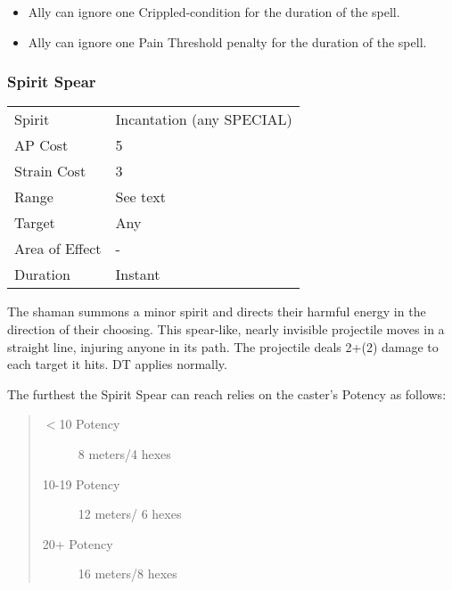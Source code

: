 \documentclass[11pt,a4paper,twocolumn]{book}
\begin{document}
\begin{itemize}
	\item Ally can ignore one Crippled-condition for the duration of the spell.
	\item Ally can ignore one Pain Threshold penalty for the duration of the spell.
\end{itemize}

\subsubsection*{Spirit Spear}
{
	\begin{tabu} to 75mm{| X[l,4] | X[l,7] |}
		\hline
		Spirit         & Incantation (any SPECIAL) \\
		AP Cost        & 5                         \\
		Strain Cost    & 3                         \\
		Range          & See text                  \\
		Target         & Any                       \\
		Area of Effect & -                         \\
		Duration       & Instant                   \\ \hline
	\end{tabu}
	
}

\medskip

The shaman summons a minor spirit and directs their harmful energy in the direction of their choosing. This spear-like, nearly invisible projectile moves in a straight line, injuring anyone in its path. The projectile deals 2+(2) damage to each target it hits. DT applies normally.

The furthest the Spirit Spear can reach relies on the caster's Potency as follows:
\begin{quote}
	\begin{description}
		\item[$<$10 Potency] 	8 meters/4 hexes
		\item[10-19 Potency] 	12 meters/ 6 hexes
		\item[20+ Potency]  	16 meters/8 hexes
	\end{description}	
\end{quote}
\end{document}
